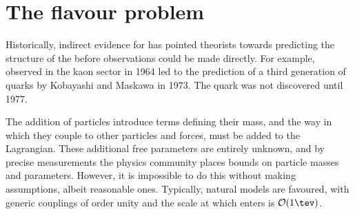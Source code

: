 \section{The flavour problem}

Historically, indirect evidence for \np has pointed theorists towards predicting the structure of
the \sm before observations could be made directly.
For example, \CPV observed in the kaon sector in 1964 led to the prediction of a third generation of
quarks by Kobayashi and Maskawa in 1973.
The \bquark quark was not discovered until 1977.







The addition of \np particles introduce terms defining their mass, and the way in which they couple
to other particles and forces, must be added to the Lagrangian.
These additional free parameters are entirely unknown, and by precise measurements the physics
community places bounds on \np particle masses and parameters.
However, it is impossible to do this without making assumptions, albeit reasonable ones.
Typically, natural models are favoured, with generic couplings of order unity and the
scale at which \np enters is $\mathcal{O}(1\tev)$.

